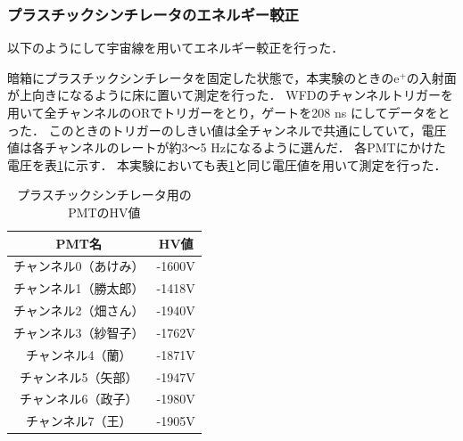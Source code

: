 







%

 \subsubsection{プラスチックシンチレータのエネルギー較正}
 以下のようにして宇宙線を用いてエネルギー較正を行った．
 
 暗箱にプラスチックシンチレータを固定した状態で，本実験のときのe$^{+}$の入射面が上向きになるように床に置いて測定を行った．
 WFDのチャンネルトリガーを用いて全チャンネルのORでトリガーをとり，ゲートを208 ns にしてデータをとった．
 このときのトリガーのしきい値は全チャンネルで共通にしていて，電圧値は各チャンネルのレートが約3〜5 Hzになるように選んだ．
 各PMTにかけた電圧を表\ref{PS_PMT_HV}に示す．
 本実験においても表\ref{PS_PMT_HV}と同じ電圧値を用いて測定を行った．
 \begin{table}[H]
  \caption{プラスチックシンチレータ用のPMTのHV値}
  \label{PS_PMT_HV}
  \begin{center}
   \begin{tabular}{cc}\toprule
    PMT名&HV値 \\ \hline
    チャンネル0（あけみ）&-1600V \\
    チャンネル1（勝太郎）&-1418V \\
    チャンネル2（畑さん）&-1940V \\
    チャンネル3（紗智子）&-1762V \\
    チャンネル4（蘭）  &-1871V \\
    チャンネル5（矢部） &-1947V \\
    チャンネル6（政子） &-1980V \\
    チャンネル7（王）  &-1905V \\ \bottomrule
   \end{tabular} 
  \end{center}
 \end{table}%

